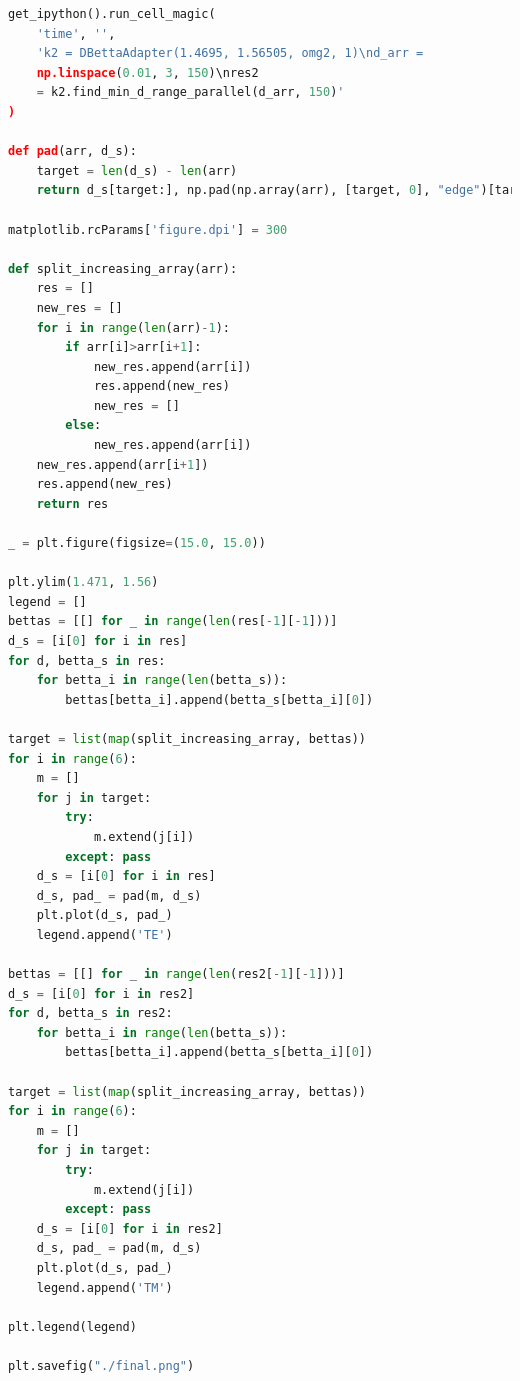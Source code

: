 \documentclass{article}
\begin{document}
\begin{lstlisting}[language=Python]
get_ipython().run_cell_magic(
    'time', '',
    'k2 = DBettaAdapter(1.4695, 1.56505, omg2, 1)\nd_arr =
    np.linspace(0.01, 3, 150)\nres2 
    = k2.find_min_d_range_parallel(d_arr, 150)'
)

def pad(arr, d_s):
    target = len(d_s) - len(arr)
    return d_s[target:], np.pad(np.array(arr), [target, 0], "edge")[target:]

matplotlib.rcParams['figure.dpi'] = 300

def split_increasing_array(arr):
    res = []
    new_res = []
    for i in range(len(arr)-1):
        if arr[i]>arr[i+1]:
            new_res.append(arr[i])
            res.append(new_res)
            new_res = []
        else:
            new_res.append(arr[i])
    new_res.append(arr[i+1])
    res.append(new_res)
    return res

_ = plt.figure(figsize=(15.0, 15.0))

plt.ylim(1.471, 1.56)
legend = []
bettas = [[] for _ in range(len(res[-1][-1]))]
d_s = [i[0] for i in res]
for d, betta_s in res:
    for betta_i in range(len(betta_s)):
        bettas[betta_i].append(betta_s[betta_i][0])

target = list(map(split_increasing_array, bettas))
for i in range(6):
    m = []
    for j in target:
        try:
            m.extend(j[i])
        except: pass
    d_s = [i[0] for i in res]
    d_s, pad_ = pad(m, d_s)
    plt.plot(d_s, pad_)
    legend.append('TE')
    
bettas = [[] for _ in range(len(res2[-1][-1]))]
d_s = [i[0] for i in res2]
for d, betta_s in res2:
    for betta_i in range(len(betta_s)):
        bettas[betta_i].append(betta_s[betta_i][0])

target = list(map(split_increasing_array, bettas))
for i in range(6):
    m = []
    for j in target:
        try:
            m.extend(j[i])
        except: pass
    d_s = [i[0] for i in res2]
    d_s, pad_ = pad(m, d_s)
    plt.plot(d_s, pad_)
    legend.append('TM')

plt.legend(legend)

plt.savefig("./final.png")

\end{lstlisting}
\end{document}
